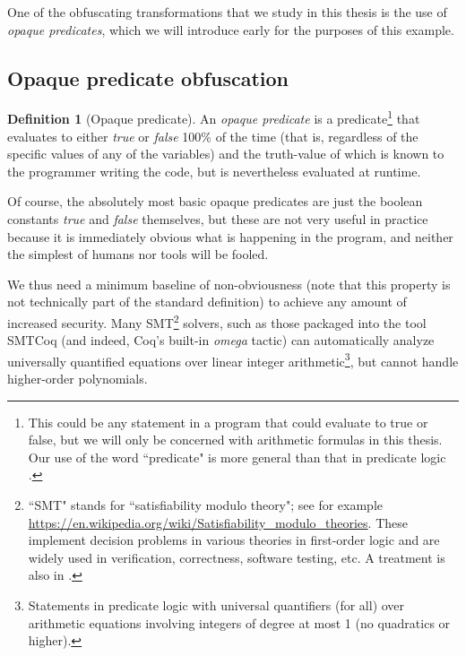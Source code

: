 \documentclass[12pt,notitlepage]{report}
\theoremstyle{plain}
\theoremstyle{definition}
\newtheorem{defin}[theo]{Definition}
\newcommand{\define}[1]{\emph{#1}\index{#1}}
\numberwithin{equation}{section}
\begin{document}
\par One of the obfuscating transformations that we study in this thesis is the use of \define{opaque predicates}, which we will introduce early for the purposes of this example.

\subsection{Opaque predicate obfuscation}

\begin{defin}[Opaque predicate]\label{opaquedefn}
	An \define{opaque predicate} \cite{CoNa} is a predicate\footnote{This could be any statement in a program that could evaluate to true or false, but we will only be concerned with arithmetic formulas in this thesis.  Our use of the word ``predicate" is more general than that in predicate logic \cite{vanDalen}.} that evaluates to either \emph{true} or \emph{false} 100\% of the time (that is, regardless of the specific values of any of the variables) and the truth-value of which is known to the programmer writing the code, but is nevertheless evaluated at runtime.
\end{defin}

Of course, the absolutely most basic opaque predicates are just the boolean constants \emph{true} and \emph{false} themselves, but these are not very useful in practice because it is immediately obvious what is happening in the program, and neither the simplest of humans nor tools will be fooled.  

\par We thus need a minimum baseline of non-obviousness (note that this property is not technically part of the standard definition) to achieve any amount of increased security.  Many SMT\footnote{``SMT" stands for ``satisfiability modulo theory"; see for example \href{https://en.wikipedia.org/wiki/Satisfiability_modulo_theories}{https://en.wikipedia.org/wiki/Satisfiability\_modulo\_theories}.  These implement decision problems in various theories in first-order logic and are widely used in verification, correctness, software testing, etc.  A treatment is also in \cite{HuRy}.} solvers, such as those packaged into the tool SMTCoq \cite{SMTCoq} (and indeed, Coq's built-in \emph{omega} tactic) can automatically analyze universally quantified equations over linear integer arithmetic\footnote{Statements in predicate logic with universal quantifiers (for all) over arithmetic equations involving integers of degree at most 1 (no quadratics or higher).}, but cannot handle higher-order polynomials.
\end{document}

